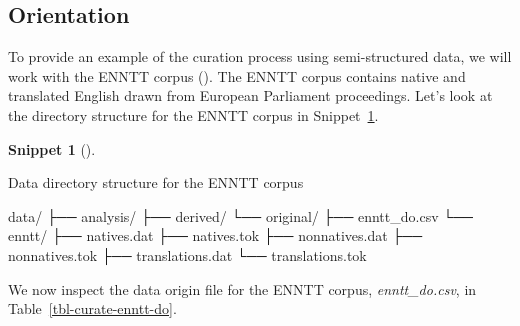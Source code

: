 \documentclass[
  letterpaper,
  krantz1]{latex/krantz-mod}
\newenvironment{Shaded}{\begin{snugshade}}{\end{snugshade}}
\newcommand{\ExtensionTok}[1]{\textcolor[rgb]{0.00,0.00,0.00}{#1}}
\newcommand{\NormalTok}[1]{\textcolor[rgb]{0.00,0.00,0.00}{#1}}
\theoremstyle{definition}
\theoremstyle{definition}
\newtheorem{definition}{Snippet}[chapter]
\theoremstyle{remark}
\begin{document}
\subsection{Orientation}\label{sec-curate-semi-structured-orientation}

To provide an example of the curation process using semi-structured
data, we will work with the ENNTT corpus
().
The ENNTT corpus contains native and translated English drawn from
European Parliament proceedings. Let's look at the directory structure
for the ENNTT corpus in Snippet~\ref{def-curate-enntt-structure}.

\begin{definition}[]\protect\hypertarget{def-curate-enntt-structure}{}\label{def-curate-enntt-structure}

Data directory structure for the ENNTT corpus

\begin{Shaded}
\begin{Highlighting}[]
\ExtensionTok{data/}
\ExtensionTok{├──}\NormalTok{ analysis/}
\ExtensionTok{├──}\NormalTok{ derived/}
\ExtensionTok{└──}\NormalTok{ original/}
    \ExtensionTok{├──}\NormalTok{ enntt\_do.csv}
    \ExtensionTok{└──}\NormalTok{ enntt/}
        \ExtensionTok{├──}\NormalTok{ natives.dat}
        \ExtensionTok{├──}\NormalTok{ natives.tok}
        \ExtensionTok{├──}\NormalTok{ nonnatives.dat}
        \ExtensionTok{├──}\NormalTok{ nonnatives.tok}
        \ExtensionTok{├──}\NormalTok{ translations.dat}
        \ExtensionTok{└──}\NormalTok{ translations.tok}
\end{Highlighting}
\end{Shaded}

\end{definition}

We now inspect the data origin file for the ENNTT corpus,
\emph{enntt\_do.csv}, in Table~\ref{tbl-curate-enntt-do}.
\end{document}
